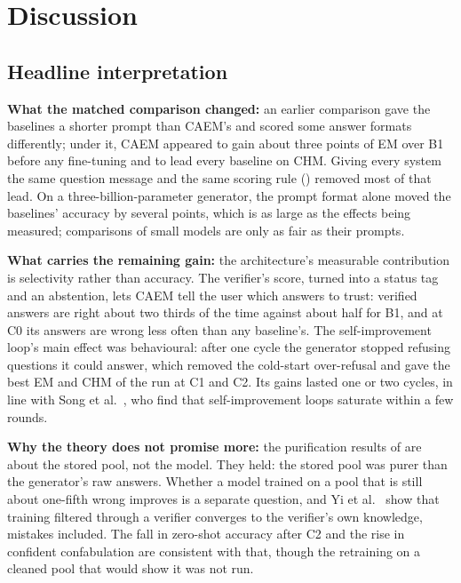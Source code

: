 \FloatBarrier

\section{Discussion}
\label{sec:discussion}

\subsection{Headline interpretation}
\label{sec:disc-headline}

\textbf{What the matched comparison changed:} an earlier comparison gave the baselines a shorter prompt than CAEM's and scored some answer formats differently; under it, CAEM appeared to gain about three points of EM over B1 before any fine-tuning and to lead every baseline on CHM. Giving every system the same question message and the same scoring rule () removed most of that lead. On a three-billion-parameter generator, the prompt format alone moved the baselines' accuracy by several points, which is as large as the effects being measured; comparisons of small models are only as fair as their prompts.

\textbf{What carries the remaining gain:} the architecture's measurable contribution is selectivity rather than accuracy. The verifier's score, turned into a status tag and an abstention, lets CAEM tell the user which answers to trust: verified answers are right about two thirds of the time against about half for B1, and at C0 its answers are wrong less often than any baseline's. The self-improvement loop's main effect was behavioural: after one cycle the generator stopped refusing questions it could answer, which removed the cold-start over-refusal and gave the best EM and CHM of the run at C1 and C2. Its gains lasted one or two cycles, in line with Song et al.~\cite{song2024gap}, who find that self-improvement loops saturate within a few rounds.

\textbf{Why the theory does not promise more:} the purification results of  are about the stored pool, not the model. They held: the stored pool was purer than the generator's raw answers. Whether a model trained on a pool that is still about one-fifth wrong improves is a separate question, and Yi et al.~\cite{fu2025collapse} show that training filtered through a verifier converges to the verifier's own knowledge, mistakes included. The fall in zero-shot accuracy after C2 and the rise in confident confabulation are consistent with that, though the retraining on a cleaned pool that would show it was not run.


